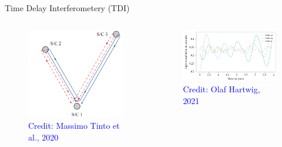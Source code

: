 \documentclass[pdf]{beamer}
\newcommand{\credit}[1]{\tiny{\textcolor{blue}{Credit: #1}}}
\begin{document}
\begin{frame}{Time Delay Interferometery (TDI)}
\begin{columns}
\begin{figure}
\includegraphics[scale=.15]{fig/LISAschem.png}
\caption*{\credit{Massimo Tinto et al., 2020}}
\end{figure}
\begin{figure}
\includegraphics[scale=.15]{fig/Distance.png}
\caption*{\credit{Olaf Hartwig, 2021}}
\end{figure}
\end{columns}
\end{frame}
\end{document}
